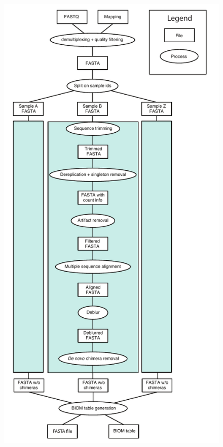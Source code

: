 \begin{figure}[htbp]
\begin{center}
\includegraphics[height=0.70\textheight]{chapter_otupicking_figures/deblurWorkflow.pdf}
\end{center}

\end{figure}
